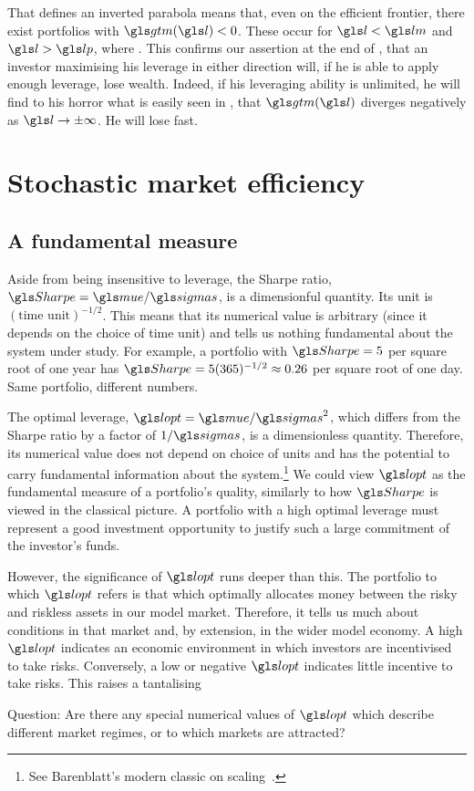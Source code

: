 That  defines an inverted parabola means that, even on the efficient frontier, there exist portfolios with $\gtm(\l) < 0$. These occur for $\l<\lm$ and $\l>\lp$, where
\be 
\lpm \equiv \lopt \pm {}.
\ee
This confirms our assertion at the end of , that an investor maximising his leverage in either direction will, if he is able to apply enough leverage, lose wealth. Indeed, if his leveraging ability is unlimited, he will find to his horror what is easily seen in , that $\gtm(\l)$ diverges negatively as $\l\to\pm\infty$. He will lose fast.

\section{Stochastic market efficiency}


\subsection{A fundamental measure}
Aside from being insensitive to leverage, the Sharpe ratio, $\Sharpe=\mue/\sigmas$, is a dimensionful quantity. Its unit is $(\text{time unit})^{-1/2}$. This means that its numerical value is arbitrary (since it depends on the choice of time unit) and tells us nothing fundamental about the system under study. For example, a portfolio with $\Sharpe=5$ per square root of one year has $\Sharpe=5(365)^{-1/2}\approx0.26$ per square root of one day. Same portfolio, different numbers.

The optimal leverage, $\lopt=\mue/\sigmas^2$, which differs from the Sharpe ratio by a factor of $1/\sigmas$, is a dimensionless quantity. Therefore, its numerical value does not depend on choice of units and has the potential to carry fundamental information about the system.\footnote{See Barenblatt's modern classic on scaling~\cite{Barenblatt2003}.} We could view $\lopt$ as the fundamental measure of a portfolio's quality, similarly to how $\Sharpe$ is viewed in the classical picture. A portfolio with a high optimal leverage must represent a good investment opportunity to justify such a large commitment of the investor's funds.

However, the significance of $\lopt$ runs deeper than this. The portfolio to which $\lopt$ refers is that which optimally allocates money between the risky and riskless assets in our model market. Therefore, it tells us much about conditions in that market and, by extension, in the wider model economy. A high $\lopt$ indicates an economic environment in which investors are incentivised to take risks. Conversely, a low or negative $\lopt$ indicates little incentive to take risks. This raises a tantalising
\begin{keypts}{Question:}
Are there any special numerical values of $\lopt$ which describe different market regimes, or to which markets are attracted?
\end{keypts}

